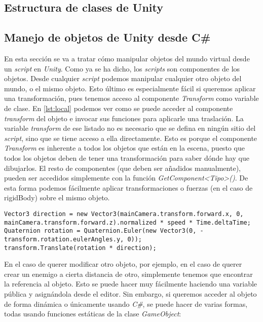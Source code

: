 \documentclass{pre-tfg}
\begin{document}
\subsection{Estructura de clases de Unity}

\subsection{Manejo de objetos de Unity desde C\#}

En esta sección se va a tratar c\'omo manipular objetos del mundo virtual desde un \textit{script} en \textit{Unity}. Como ya se ha dicho, los \textit{scripts} son componentes de los objetos. Desde cualquier \textit{script} podemos manipular cualquier otro objeto del mundo, o el mismo objeto. Esto último es especialmente f\'acil si queremos aplicar una transformación, pues tenemos acceso al componente \textit{Transform} como variable de clase. En \ref{lst:local} podemos ver como se puede acceder al componente \textit{transform} del objeto e invocar sus funciones para aplicarle una traslación. La variable \textit{transform} de ese listado no es necesario que se defina en ningún sitio del \textit{script}, sino que se tiene acceso a ella directamente. Esto es porque el componente \textit{Transform} es inherente a todos los objetos que están en la escena, puesto que todos los objetos deben de tener una transformación para saber dónde hay que dibujarlos. El resto de componentes (que deben ser añadidos manualmente), pueden ser accedidos simplemente con la función \textit{GetComponent<Tipo>()}. De esta forma podemos fácilmente aplicar transformaciones o fuerzas (en el caso de rigidBody) sobre el mismo objeto.

\begin{spacing}{1}
\begin{lstlisting}[float=htbp, caption={Acceso al componente transform para modificar el propio objeto}, label=lst:local]
Vector3 direction = new Vector3(mainCamera.transform.forward.x, 0, mainCamera.transform.forward.z).normalized * speed * Time.deltaTime;
Quaternion rotation = Quaternion.Euler(new Vector3(0, -transform.rotation.eulerAngles.y, 0));
transform.Translate(rotation * direction);
\end{lstlisting}
\end{spacing}

En el caso de querer modificar otro objeto, por ejemplo, en el caso de querer crear un enemigo a cierta distancia de otro, simplemente tenemos que encontrar la referencia al objeto. Esto se puede hacer muy fácilmente haciendo una variable pública y asignándola desde el editor. Sin embargo, si queremos acceder al objeto de forma dinámica o únicamente usando \textit{C\#}, se puede hacer de varias formas, todas usando funciones estáticas de la clase \textit{GameObject}:
\end{document}
